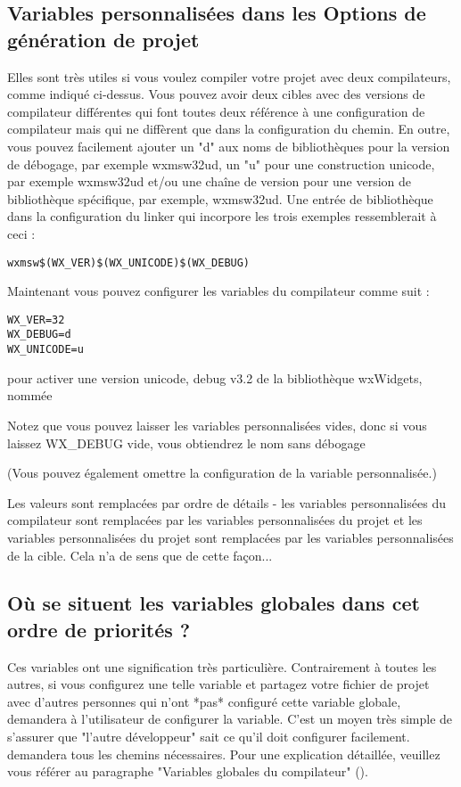 \subsection{Variables personnalisées dans les Options de génération de projet}

Elles sont très utiles si vous voulez compiler votre projet avec deux compilateurs, comme indiqué ci-dessus. 
Vous pouvez avoir deux cibles avec des versions de compilateur différentes qui font toutes deux référence à une configuration de compilateur mais qui ne diffèrent que dans la configuration du chemin. 
En outre, vous pouvez facilement ajouter un "d" aux noms de bibliothèques pour la version de débogage, par exemple wxmsw32ud, un "u" pour une construction unicode, par exemple wxmsw32ud et/ou une chaîne de version pour une version de bibliothèque spécifique, 
par exemple, wxmsw32ud. \newline
Une entrée de bibliothèque dans la configuration du linker qui incorpore les trois exemples ressemblerait à ceci :
\begin{verbatim}
wxmsw$(WX_VER)$(WX_UNICODE)$(WX_DEBUG)
\end{verbatim}

Maintenant vous pouvez configurer les variables du compilateur comme suit :
\begin{verbatim}
WX_VER=32
WX_DEBUG=d
WX_UNICODE=u
\end{verbatim}
pour activer une version unicode, debug v3.2 de la bibliothèque wxWidgets, nommée


Notez que vous pouvez laisser les variables personnalisées vides, donc si vous laissez WX\_DEBUG vide, vous obtiendrez le nom sans débogage


(Vous pouvez également omettre la configuration de la variable personnalisée.)

Les valeurs sont remplacées par ordre de détails - les variables personnalisées du compilateur sont remplacées par les variables personnalisées du projet et les variables personnalisées du projet sont remplacées par les variables personnalisées de la cible. Cela n'a de sens que de cette façon... 

\subsection{Où se situent les variables globales dans cet ordre de priorités ?}

Ces variables ont une signification très particulière. Contrairement à toutes les autres, si vous configurez une telle variable et partagez votre fichier de projet avec d'autres personnes qui n'ont *pas* configuré cette variable globale, \codeblocks 
demandera à l'utilisateur de configurer la variable. C'est un moyen très simple de s'assurer que "l'autre développeur" sait ce qu'il doit configurer facilement. \codeblocks demandera tous les chemins nécessaires.\newline
Pour une explication détaillée, veuillez vous référer au paragraphe "Variables globales du compilateur" (). 
